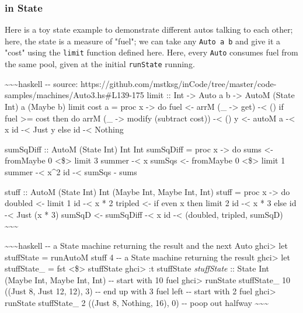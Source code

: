 \documentclass[]{article}
\begin{document}
\subsubsection{in State}

Here is a toy state example to demonstrate different autos talking to each
other; here, the state is a measure of "fuel"; we can take any
\texttt{Auto\ a\ b} and give it a "cost" using the \texttt{limit} function
defined here. Here, every \texttt{Auto} consumes fuel from the same pool, given
at the initial \texttt{runState} running.

\textasciitilde{}\textasciitilde{}\textasciitilde{}haskell -\/- source:
https://github.com/mstksg/inCode/tree/master/code-samples/machines/Auto3.hs\#L139-175
limit :: Int -\textgreater{} Auto a b -\textgreater{} AutoM (State Int) a (Maybe
b) limit cost a = proc x -\textgreater{} do fuel \textless{}- arrM (\_
-\textgreater{} get) -\textless{} () if fuel \textgreater{}= cost then do arrM
(\_ -\textgreater{} modify (subtract cost)) -\textless{} () y \textless{}- autoM
a -\textless{} x id -\textless{} Just y else id -\textless{} Nothing

sumSqDiff :: AutoM (State Int) Int Int sumSqDiff = proc x -\textgreater{} do
sums \textless{}- fromMaybe 0 \textless{}\$\textgreater{} limit 3 summer
-\textless{} x sumSqs \textless{}- fromMaybe 0 \textless{}\$\textgreater{} limit
1 summer -\textless{} x\^{}2 id -\textless{} sumSqs - sums

stuff :: AutoM (State Int) Int (Maybe Int, Maybe Int, Int) stuff = proc x
-\textgreater{} do doubled \textless{}- limit 1 id -\textless{} x * 2 tripled
\textless{}- if even x then limit 2 id -\textless{} x * 3 else id -\textless{}
Just (x * 3) sumSqD \textless{}- sumSqDiff -\textless{} x id -\textless{}
(doubled, tripled, sumSqD) \textasciitilde{}\textasciitilde{}\textasciitilde{}

\textasciitilde{}\textasciitilde{}\textasciitilde{}haskell -\/- a State machine
returning the result and the next Auto ghci\textgreater{} let stuffState =
runAutoM stuff 4 -\/- a State machine returning the result ghci\textgreater{}
let stuffState\_ = fst \textless{}\$\textgreater{} stuffState ghci\textgreater{}
:t stuffState\emph{ stuffState} :: State Int (Maybe Int, Maybe Int, Int) -\/-
start with 10 fuel ghci\textgreater{} runState stuffState\_ 10 ((Just 8, Just
12, 12), 3) -\/- end up with 3 fuel left -\/- start with 2 fuel
ghci\textgreater{} runState stuffState\_ 2 ((Just 8, Nothing, 16), 0) -\/- poop
out halfway \textasciitilde{}\textasciitilde{}\textasciitilde{}
\end{document}
